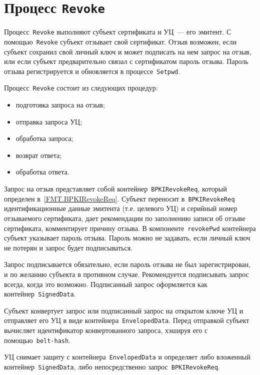 \section{Процесс \texttt{Revoke}}\label{PROCESSES.Revoke}

Процесс~\texttt{Revoke} выполняют субъект сертификата и УЦ~---
его эмитент. С помощью~\texttt{Revoke} субъект отзывает свой сертификат.
Отзыв возможен, если субъект сохранил свой личный ключ и может подписать 
на нем запрос на отзыв, или если субъект предварительно связал с 
сертификатом пароль отзыва. Пароль отзыва регистрируется и обновляется
в процессе~\texttt{Setpwd}.


Процесс~\texttt{Revoke} состоит из следующих процедур:
\begin{itemize}
\item
подготовка запроса на отзыв;
\item
отправка запроса УЦ;
\item
обработка запроса;
\item
возврат ответа;
\item
обработка ответа.
\end{itemize}

Запрос на отзыв представляет собой контейнер~\texttt{BPKIRevokeReq},
который определен в~\ref{FMT.BPKIRevokeReq}. Субъект переносит 
в~\texttt{BPKIRevokeReq} идентификационные данные эмитента (т.е. целевого 
УЦ) и серийный номер отзываемого сертификата, дает рекомендации по 
заполнению записи об отзыве сертификата, комментирует причину отзыва. В 
компоненте~\texttt{revokePwd} контейнера субъект указывает пароль отзыва. 
Пароль можно не задавать, если личный ключ не потерян и запрос будет 
подписываться.

Запрос подписывается обязательно, если пароль отзыва не был 
зарегистрирован, и по желанию субъекта в противном случае.
%
Рекомендуется подписывать запрос всегда, когда это возможно.
%
Подписанный запрос оформляется как контейнер~\texttt{SignedData}.

Субъект конвертует запрос или подписанный запрос на открытом ключе УЦ
и отправляет его УЦ в виде контейнера~\texttt{EnvelopedData}.
Перед отправкой субъект вычисляет идентификатор конвертованного запроса,
хэшируя его с помощью~\texttt{belt-hash}.

УЦ снимает защиту с контейнера~\texttt{EnvelopedData} и определяет 
либо вложенный контейнер~\texttt{SignedData}, либо непосредственно
запрос~\texttt{BPKIRevokeReq}.

